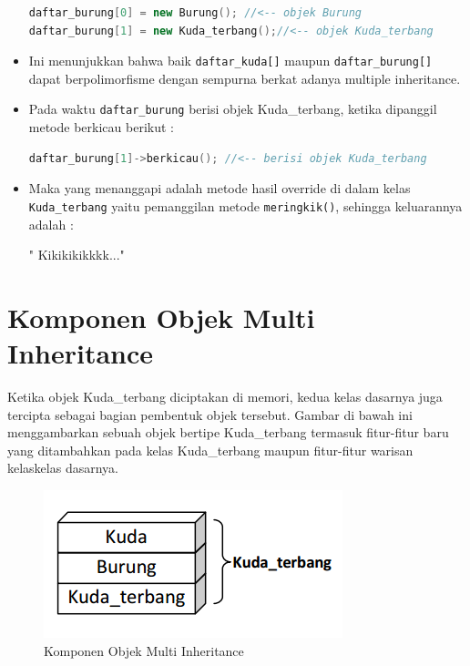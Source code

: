 \begin{itemize}
\begin{lstlisting}[language=c++, numbers=none]
daftar_burung[0] = new Burung(); //<-- objek Burung
daftar_burung[1] = new Kuda_terbang();//<-- objek Kuda_terbang
\end{lstlisting}
\item
  Ini menunjukkan bahwa baik \texttt{daftar\_kuda{[}{]}} maupun
  \texttt{daftar\_burung{[}{]}} dapat berpolimorfisme dengan sempurna
  berkat adanya multiple inheritance.
\item
  Pada waktu \texttt{daftar\_burung} berisi objek Kuda\_terbang, ketika
  dipanggil metode berkicau berikut :

\begin{lstlisting}[language=c++, numbers=none]
daftar_burung[1]->berkicau(); //<-- berisi objek Kuda_terbang
\end{lstlisting}
\item
  Maka yang menanggapi adalah metode hasil override di dalam kelas
  \texttt{Kuda\_terbang} yaitu pemanggilan metode \texttt{meringkik()},
  sehingga keluarannya adalah :

\begin{lcverbatim}
" Kikikikikkkk..."
\end{lcverbatim}
\end{itemize}

\section{Komponen Objek Multi Inheritance}\label{komponen-objek-multi-inheritance}

Ketika objek Kuda\_terbang diciptakan di memori, kedua kelas dasarnya
juga tercipta sebagai bagian pembentuk objek tersebut. Gambar di bawah
ini menggambarkan sebuah objek bertipe Kuda\_terbang termasuk
fitur-fitur baru yang ditambahkan pada kelas Kuda\_terbang maupun
fitur-fitur warisan kelaskelas dasarnya.

\begin{figure}[htbp]
\centering
\includegraphics{../manuscript/images/capture9-2}
\caption{Komponen Objek Multi Inheritance}
\end{figure}

